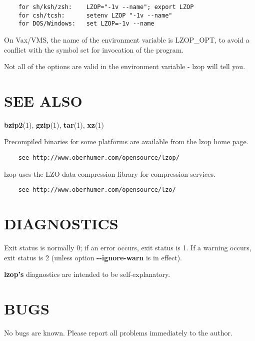 \begin{verbatim}
    for sh/ksh/zsh:    LZOP="-1v --name"; export LZOP
    for csh/tcsh:      setenv LZOP "-1v --name"
    for DOS/Windows:   set LZOP=-1v --name
\end{verbatim}


On Vax/VMS, the name of the environment variable is
LZOP\_OPT, to avoid a conflict with the symbol set for
invocation of the program.



Not all of the options are valid in the environment variable -
lzop will tell you.

\section{SEE ALSO\label{SEE_ALSO}}


\textbf{bzip2}(1), \textbf{gzip}(1), \textbf{tar}(1), \textbf{xz}(1)



Precompiled binaries for some platforms are available
from the lzop home page.

\begin{verbatim}
    see http://www.oberhumer.com/opensource/lzop/
\end{verbatim}


lzop uses the LZO data compression library for compression
services.

\begin{verbatim}
    see http://www.oberhumer.com/opensource/lzo/
\end{verbatim}
\section{DIAGNOSTICS\label{DIAGNOSTICS}}


Exit status is normally 0; if an error occurs, exit status
is 1. If a warning occurs, exit status is 2 (unless
option \textbf{-{}-ignore-warn} is in effect).



\textbf{lzop's} diagnostics are intended to be self-explanatory.

\section{BUGS\label{BUGS}}


No bugs are known. Please report all problems immediately to the author.

